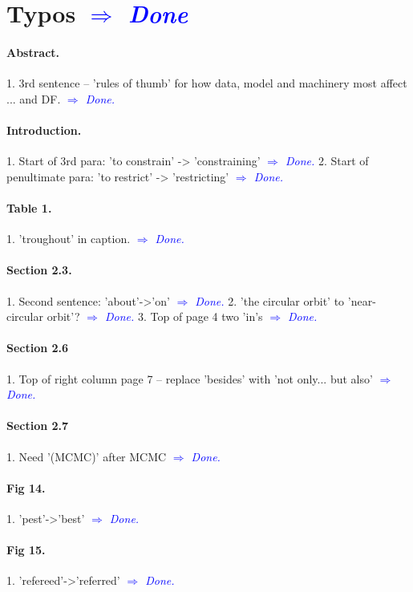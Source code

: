 \documentclass[10pt,a4paper]{article}
\newcommand{\Comment}[1]{\textsl{\textcolor{Blue}{$\Longrightarrow$ {#1}}}}
\begin{document}
\section{Typos \Comment{Done}}

\paragraph{Abstract.} 1. 3rd sentence -- 'rules of thumb' for how data, model and machinery most affect ... and DF. \Comment{Done.}

\paragraph{Introduction.} 1. Start of 3rd para: 'to constrain' -> 'constraining'  \Comment{Done.} 2. Start of penultimate para: 'to restrict' -> 'restricting' \Comment{Done.}

\paragraph{Table 1.} 1. 'troughout' in caption. \Comment{Done.}

\paragraph{Section 2.3.} 1. Second sentence: 'about'->'on' \Comment{Done.} 2. 'the circular orbit' to 'near-circular orbit'? \Comment{Done.} 3. Top of page 4 two 'in's \Comment{Done.}

\paragraph{Section 2.6} 1. Top of right column page 7 -- replace 'besides' with 'not only... but also' \Comment{Done.}

\paragraph{Section 2.7} 1. Need '(MCMC)' after MCMC \Comment{Done.}

\paragraph{Fig 14.} 1. 'pest'->'best' \Comment{Done.}

\paragraph{Fig 15.} 1. 'refereed'->'referred'  \Comment{Done.}
\end{document}
